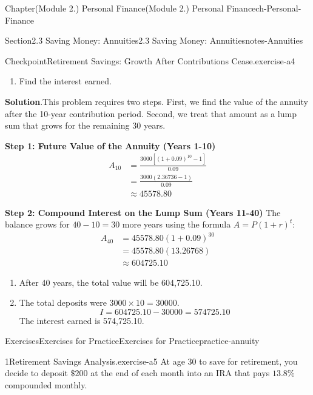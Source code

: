 \documentclass[oneside,10pt,]{book}
\newcommand{\blocktitlefont}{\relax}
\newcommand{\terminology}[1]{\textbf{#1}}
\newcommand{\amp}{&}
\begin{document}
\begin{chapterptx}{Chapter}{(Module 2.) Personal Finance}{}{(Module 2.) Personal Finance}{}{}{ch-Personal-Finance}
\begin{sectionptx}{Section}{2.3 Saving Money: Annuities}{}{2.3 Saving Money: Annuities}{}{}{notes-Annuities}
\begin{inlineexercise}{Checkpoint}{Retirement Savings: Growth After Contributions Cease.}{exercise-a4}
\begin{enumerate}[label={\arabic*}]
\item{}Find the interest earned.%
\end{enumerate}
\par\smallskip%
\noindent\textbf{\blocktitlefont Solution}.\hypertarget{exercise-a4-3}{}\quad{}This problem requires two steps. First, we find the value of the annuity after the 10-year contribution period. Second, we treat that amount as a lump sum that grows for the remaining 30 years.%
\par
\terminology{Step 1: Future Value of the Annuity (Years 1-10)}%
\begin{align*}
A_{10} \amp = \frac{3000\left[(1 + 0.09)^{10} - 1\right]}{0.09}\\
\amp = \frac{3000(2.36736 - 1)}{0.09}\\
\amp \approx 45578.80
\end{align*}
%
\par
\terminology{Step 2: Compound Interest on the Lump Sum (Years 11-40)} The balance grows for \(40 - 10 = 30\) more years using the formula \(A = P(1 + r)^t\):%
\begin{align*}
A_{40} \amp = 45578.80(1 + 0.09)^{30}\\
\amp = 45578.80(13.26768)\\
\amp \approx 604725.10
\end{align*}
%
%
\begin{enumerate}[label={\arabic*}]
\item{}After 40 years, the total value will be \textdollar{}604,725.10.%
\item{}The total deposits were \(3000 \times 10 = 30000\).%
\begin{equation*}
I = 604725.10 - 30000 = 574725.10
\end{equation*}
The interest earned is \textdollar{}574,725.10.%
\end{enumerate}
\end{inlineexercise}%
%
%
\typeout{************************************************}
\typeout{************************************************}
%
\begin{exercises-subsection-numberless}{Exercises}{Exercises for Practice}{}{Exercises for Practice}{}{}{practice-annuity}
\begin{divisionexercise}{1}{Retirement Savings Analysis.}{}{exercise-a5}%
At age 30 to save for retirement, you decide to deposit \(\$200\) at the end of each month into an IRA that pays \(13.8\%\) compounded monthly.%
\begin{enumerate}[label={\arabic*}]

\end{enumerate}
\end{divisionexercise}
\end{exercises-subsection-numberless}
\end{sectionptx}
\end{chapterptx}
\end{document}
